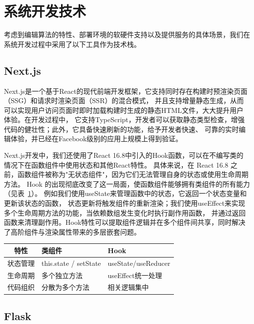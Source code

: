 \section{系统开发技术}

考虑到编辑算法的特性、部署环境的软硬件支持以及提供服务的具体场景，我们在系统开发过程中采用了以下工具作为技术栈。

\subsection{Next.js}

Next.js是一个基于React的现代前端开发框架，它支持同时存在构建时预渲染页面（SSG）和请求时渲染页面（SSR）的混合模式，
并且支持增量静态生成，从而可以实现用户访问页面时即时加载构建时生成的静态HTML文件，大大提升用户体验。在开发过程中，
它支持TypeScript，开发者可以获取静态类型检查，增强代码的健壮性；此外，它具备快速刷新的功能，给予开发者快速、
可靠的实时编辑体验，并已经在Facebook级别的应用上规模上得到验证。

Next.js开发中，我们还使用了React 16.8中引入的Hook函数，可以在不编写类的情况下在函数组件中使用状态和其他React特性。
具体来说，在 React 16.8 之前，函数组件被称为"无状态组件"，因为它们无法管理自身的状态或使用生命周期方法。
Hook 的出现彻底改变了这一局面，使函数组件能够拥有类组件的所有能力（见表~\ref{tab:hooks}）。
例如我们使用useState来管理函数中的状态，它返回一个状态变量和更新该状态的函数，
状态更新将触发组件的重新渲染；我们使用useEffect来实现多个生命周期方法的功能，当依赖数组发生变化时执行副作用函数，
并通过返回函数来清理副作用。Hook特性可以提取组件逻辑并在多个组件间共享，同时解决了高阶组件与渲染属性带来的多层嵌套问题。

\begin{table}
    \centering
    \label{tab:hooks}
    \begin{tabular}{cll}
        \toprule
        特性   & 类组件  &Hook                                  \\
        \midrule
        状态管理 & this.state / setState & useState/useReducer \\
        生命周期 & 多个独立方法 & useEffect统一处理   \\
        代码组织 & 分散为多个方法 & 相关逻辑集中  \\
        \bottomrule
    \end{tabular}
\end{table}

\subsection{Flask}

